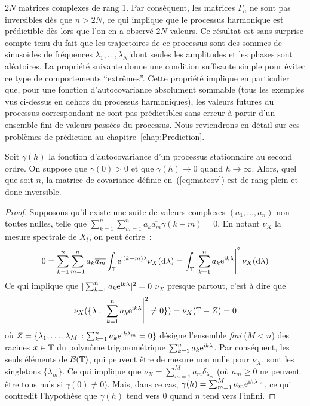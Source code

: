 $2 N$ matrices complexes de rang 1. Par cons\'equent, les matrices
$\Gamma_n$ ne sont pas inversibles d\`es que $n > 2N$, ce qui
implique que le processus harmonique est pr\'edictible d\`es lors
que l'on en a observ\'e $2N$ valeurs. Ce r\'esultat est sans surprise
compte tenu du fait que les trajectoires de ce processus sont des
sommes de sinuso\"{i}des de fr\'equences $\lambda_1,\dots,
\lambda_N$ dont seules les amplitudes et les phases sont
al\'eatoires. La propri\'et\'e suivante donne une condition suffisante
simple pour \'eviter ce type de comportements ``extr\^{e}mes''.
Cette propri\'et\'e implique en particulier que, pour une fonction
d'autocovariance absolument sommable (tous les exemples vus
ci-dessus en dehors du processus harmoniques), les valeurs futures
du processus correspondant ne sont pas pr\'edictibles sans erreur \`a
partir d'un ensemble fini de valeurs pass\'ees du processus. Nous
reviendrons en d\'etail sur ces probl\`emes de pr\'ediction au
chapitre~\ref{chap:Prediction}.
\begin{proposition}
 \label{prop:Gammanrangplein}
Soit $\gamma(h)$ la fonction d'autocovariance d'un processus
stationnaire au second ordre. On suppose que $\gamma(0)>0$ et que
$\gamma(h)\rightarrow 0$ quand $h\rightarrow \infty$. Alors, quel
que soit $n$, la matrice de covariance d\'efinie
en~(\ref{eq:matcov}) est de rang plein et donc inversible.
\end{proposition}
\begin{proof}
 Supposons qu'il existe une suite de valeurs complexes $(a_1,\dots,a_n)$
non toutes nulles, telle que $\sum_{k=1}^n\sum_{m=1}^n a_k \overline{a_m}
\gamma(k-m)=0$. En notant $\nu_X$ la mesure spectrale de $X_t$, on
peut \'ecrire~:
\begin{eqnarray*}
  0
    =\sum_{k=1}^n\sum_{m=1}^n a_k \overline{a_m}
\int_{\mathbb{T}} \mathrm{e}^{\mathrm{i}(k-m)\lambda}\nu_X(\mathrm{d}\lambda)
    =\int_{\mathbb{T}} \left| \sum_{k=1}^n a_k \mathrm{e}^{\mathrm{i} k \lambda}\right|^2 \nu_X(\mathrm{d}\lambda)
\end{eqnarray*}
Ce qui implique que $| \sum_{k=1}^n a_k \mathrm{e}^{\mathrm{i} k \lambda}|^2=0$ $\nu_X$ presque partout, c'est \`a dire que $$
\nu_X(\{\lambda
: \left| \sum_{k=1}^n a_k \mathrm{e}^{\mathrm{i} k \lambda}\right|^2\neq 0\})=\nu_X(\mathbb{T}-Z)=0
$$
o\`u
$Z=\{\lambda_1,\dots,\lambda_M\,: \sum_{k=1}^n a_k \mathrm{e}^{\mathrm{i} k \lambda_m}
= 0\}$ d\'esigne l'ensemble \emph{fini} ($M<n$) des racines $x\in \mathbb{T}$
du polyn\^ome trigonom\'etrique $\sum_{k=1}^n a_k \mathrm{e}^{\mathrm{i} k \lambda}$. Par
cons\'equent, les seuls \'el\'ements de $\mathcal{B}(\mathbb{T})$, qui peuvent \^{e}tre
de mesure non nulle pour $\nu_X$, sont les singletons
$\{\lambda_m\}$. Ce qui implique que $\nu_X=\sum_{m=1}^M a_m
\delta_{\lambda_m}$ (o\`u $a_m\geq 0$ ne peuvent \^{e}tre tous
nuls si $\gamma(0)\neq 0$). Mais, dans ce cas,
$\gamma(h)=\sum_{m=1}^M a_m \mathrm{e}^{\mathrm{i} h\lambda_m}$, ce qui contredit
l'hypoth\`ese que $\gamma(h)$ tend vers $0$ quand $n$ tend vers
l'infini.
\end{proof}




